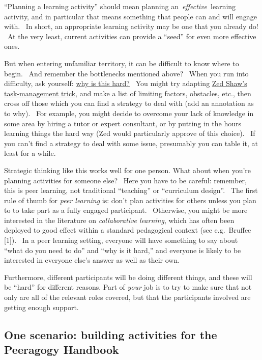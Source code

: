 ``Planning a learning activity'' should mean planning
an~\emph{effective}~learning activity, and in particular that means
something that people can and will engage with. ~In short, an
appropriate learning activity may be one that you already do! ~At the
very least, current activities can provide a ``seed'' for even more
effective ones.

But when entering unfamiliar territory, it can be difficult to know
where to begin.~ And remember the bottlenecks mentioned above?~ When you
run into difficulty, ask yourself:
\href{http://peeragogy.org/patterns-and-heuristics/}{why is this hard?}~
You might try adapting
\href{http://learnpythonthehardway.org/book/intro.html\#comment-409972596}{Zed
Shaw's task-management trick}, and make a list of limiting factors,
obstacles, etc., then cross off those which you can find a strategy to
deal with (add an annotation as to why). ~For example, you might decide
to overcome your lack of knowledge in some area by hiring a tutor or
expert consultant, or by putting in the hours learning things the hard
way (Zed would particularly approve of this choice).~ If you can't find
a strategy to deal with some issue, presumably you can table it, at
least for a while.

Strategic thinking like this works well for one person. What about when
you're planning activities for someone else? ~Here you have to be
careful: remember, this is peer learning, not traditional ``teaching''
or ``curriculum design''. ~The first rule of thumb for \emph{peer
learning} is: don't plan activities for others unless you plan to to
take part as a fully engaged participant.~ Otherwise, you might be more
interested in the literature on \emph{collaborative learning}, which has
often been deployed to good effect within a standard pedagogical context
(see e.g.~Bruffee {{[}1{]}}).~ In a peer learning setting, everyone will
have something to say about~ ``what do you need to do'' and ``why is it
hard,'' and everyone is likely to be interested in everyone else's
answer as well as their own.

Furthermore, different participants will be doing different things, and
these will be ``hard'' for different reasons. Part of \emph{your} job is
to try to make sure that not only are all of the relevant roles covered,
but that the participants involved are getting enough support.

\subsection{One scenario: building activities for the Peeragogy
Handbook}\label{one-scenario-building-activities-for-the-peeragogy-handbook}

